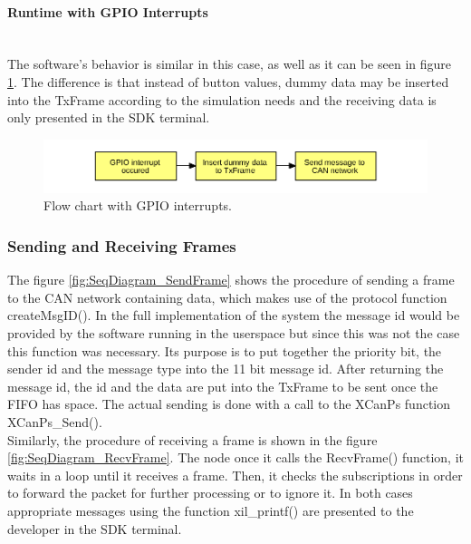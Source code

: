 \paragraph{Runtime with GPIO Interrupts}~\\
The software's behavior is similar in this case, as well as it can be seen in figure \ref{fig:FlowChart_CANSoft_GPIOIntr}.
The difference is that instead of button values, dummy data may be inserted into the TxFrame according to the simulation needs and the receiving data is only presented in the SDK terminal.
\begin{figure}[h!]
	\centering
	\includegraphics[width = 1\linewidth]{graphics/FlowChart_CANSoft_GPIOIntr.pdf}
	\caption{Flow chart with GPIO interrupts.}
	\label{fig:FlowChart_CANSoft_GPIOIntr}
\end{figure}

\subsubsection{Sending and Receiving Frames}
The figure \ref{fig:SeqDiagram_SendFrame} shows the procedure of sending a frame to the CAN network containing data, which makes use of the protocol function createMsgID().
In the full implementation of the system the message id would be provided by the software running in the userspace but since this was not the case this function was necessary.
Its purpose is to put together the priority bit, the sender id and the message type into the 11 bit message id.
After returning the message id, the id and the data are put into the TxFrame to be sent once the FIFO has space.
The actual sending is done with a call to the XCanPs function XCanPs\_Send().
\\
Similarly, the procedure of receiving a frame is shown in the figure \ref{fig:SeqDiagram_RecvFrame}.
The node once it calls the RecvFrame() function, it waits in a loop until it receives a frame.
Then, it checks the subscriptions in order to forward the packet for further processing or to ignore it.
In both cases appropriate messages using the function xil\_printf() are presented to the developer in the SDK terminal.

